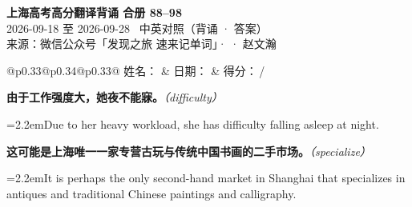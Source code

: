 \documentclass[11pt,a4paper]{article}
\newcommand{\num}[1]{\makebox[1.9em][r]{#1.}\hspace{0.3em}}
\newcommand{\prompt}[1]{\emph{\textcolor{tipblue}{\small（#1）}}}
\begin{document}
\pagestyle{plain}
\begin{center}
{\LARGE\bfseries 上海高考高分翻译背诵 \quad 合册 88–98}\\[0.25em]
{\large 2026-09-18 至 2026-09-28 \quad\ 中英对照（背诵 · 答案）}\\[0.35em]
{\footnotesize 来源：微信公众号「发现之旅 速来记单词」·  · 赵文瀚}
\end{center}

\vspace{0.4em}
\noindent\begin{tabular}{@{}p{0.33\textwidth}@{}p{0.34\textwidth}@{}p{0.33\textwidth}@{}}
姓名：\underline{\hspace{2.0cm}} & 日期：\underline{\hspace{2.0cm}} & 得分：\underline{\hspace{1.4cm}}\,/ \\
\end{tabular}

\vspace{0.5em}

\vspace{0.8em}
\vspace{0.35em}\vspace{0.15em}

\begin{minipage}{\linewidth}

\num{1}\textbf{由于工作强度大，她夜不能寐。}\prompt{difficulty}

\vspace{0.15em}

\noindent\hangindent=2.2em\hspace{2.2em}Due to her heavy workload, she has difficulty falling asleep at night.

\end{minipage}

\begin{minipage}{\linewidth}

\num{2}\textbf{这可能是上海唯一一家专营古玩与传统中国书画的二手市场。}\prompt{specialize}

\vspace{0.15em}

\noindent\hangindent=2.2em\hspace{2.2em}It is perhaps the only second-hand market in Shanghai that specializes in antiques and traditional Chinese paintings and calligraphy.

\end{minipage}
\end{document}

